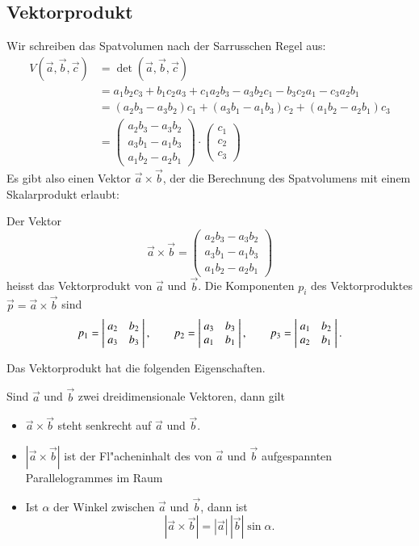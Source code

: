 \subsection{Vektorprodukt}
Wir schreiben das Spatvolumen nach der Sarrusschen Regel aus:
\begin{align*}
V(\vec a,\vec b,\vec c)&=\det(\vec a,\vec b,\vec c)\\
&=
a_1b_2c_3+b_1c_2a_3+c_1a_2b_3
-a_3b_2c_1-b_3c_2a_1-c_3a_2b_1\\
&=
(a_2b_3-a_3b_2)c_1+(a_3b_1-a_1b_3)c_2+(a_1b_2-a_2b_1)c_3
\\
&=
\begin{pmatrix}
a_2b_3-a_3b_2\\
a_3b_1-a_1b_3\\
a_1b_2-a_2b_1
\end{pmatrix}
\cdot
\begin{pmatrix}
c_1\\c_2\\c_3
\end{pmatrix}
\end{align*}
Es gibt also einen Vektor $\vec a\times\vec b$, der die Berechnung
des Spatvolumens mit einem Skalarprodukt erlaubt:
\begin{definition}
Der Vektor
\[
\vec a\times\vec b= \begin{pmatrix}
a_2b_3-a_3b_2\\
a_3b_1-a_1b_3\\
a_1b_2-a_2b_1
\end{pmatrix}
\]
heisst das Vektorprodukt von $\vec a$ und $\vec b$.
Die Komponenten $p_i$
des Vektorproduktes $\vec p=\vec a\times \vec b$ sind
\[
p_1
=
\left|\;\begin{matrix}
a_2&b_2\\a_3&b_3
\end{matrix}\;\right|\\
,\qquad p_2=
\left|\;\begin{matrix}
a_3&b_3\\a_1&b_1
\end{matrix}\;\right|\\
,\qquad p_3=
\left|\;\begin{matrix}
a_1&b_2\\a_2&b_1
\end{matrix}\;\right|.
\]
\end{definition}
Das Vektorprodukt hat die folgenden Eigenschaften.
\begin{satz}
Sind $\vec a$ und $\vec b$ zwei dreidimensionale Vektoren, dann gilt
\begin{itemize}
\item $\vec a\times\vec b$ steht senkrecht auf $\vec a$ und $\vec b$.
\item $|\vec a\times\vec b|$ ist der Fl"acheninhalt des von
$\vec a$ und $\vec b$ aufgespannten Parallelogrammes im Raum
\item Ist $\alpha$ der Winkel zwischen $\vec a$ und $\vec b$, dann
ist
\[
|\vec a\times\vec b|=|\vec a|\,|\vec b|\sin \alpha.
\]
\end{itemize}
\end{satz}
